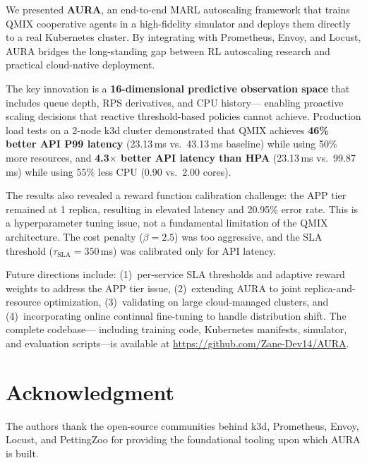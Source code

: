 \documentclass[conference]{IEEEtran}
\begin{document}
We presented \textbf{AURA}, an end-to-end MARL autoscaling framework
that trains QMIX cooperative agents in a high-fidelity simulator and
deploys them directly to a real Kubernetes cluster. By integrating
with Prometheus, Envoy, and Locust, AURA bridges the long-standing
gap between RL autoscaling research and practical cloud-native
deployment.

The key innovation is a \textbf{16-dimensional predictive observation
space} that includes queue depth, RPS derivatives, and CPU history---
enabling proactive scaling decisions that reactive threshold-based
policies cannot achieve. Production load tests on a 2-node k3d cluster
demonstrated that QMIX achieves \textbf{46\% better API P99 latency}
(23.13\,ms vs.\ 43.13\,ms baseline) while using 50\% more resources,
and \textbf{4.3$\times$ better API latency than HPA} (23.13\,ms vs.\
99.87\,ms) while using 55\% less CPU (0.90 vs.\ 2.00 cores).

The results also revealed a reward function calibration challenge: the
APP tier remained at 1 replica, resulting in elevated latency and
20.95\% error rate. This is a hyperparameter tuning issue, not a
fundamental limitation of the QMIX architecture. The cost penalty
($\beta = 2.5$) was too aggressive, and the SLA threshold
($\tau_{\mathrm{SLA}} = 350$\,ms) was calibrated only for API latency.

Future directions include: (1)~per-service SLA thresholds and adaptive
reward weights to address the APP tier issue, (2)~extending AURA to
joint replica-and-resource optimization, (3)~validating on large
cloud-managed clusters, and (4)~incorporating online continual
fine-tuning to handle distribution shift. The complete codebase---
including training code, Kubernetes manifests, simulator, and
evaluation scripts---is available at
\url{https://github.com/Zane-Dev14/AURA}.

\section*{Acknowledgment}

The authors thank the open-source communities behind k3d, Prometheus,
Envoy, Locust, and PettingZoo for providing the foundational tooling
upon which AURA is built.
\end{document}
